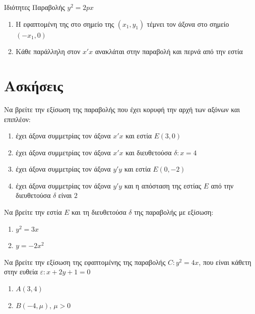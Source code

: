 \documentclass[greek]{beamer}
\begin{document}
\begin{frame}[label=Ιδιότητες]{Ιδιότητες Παραβολής $y^2=2px$}
  \begin{enumerate}
    \item<1-> Η εφαπτομένη της στο σημείο της $(x_1,y_1)$ τέμνει τον άξονα στο σημείο $(-x_1,0)$
    \item<2-> Κάθε παράλληλη στον $x'x$ ανακλάται στην παραβολή και περνά από την εστία
  \end{enumerate}

\end{frame}

\section{Ασκήσεις}
\begin{askisi}
  Να βρείτε την εξίσωση της παραβολής που έχει κορυφή την αρχή των αξόνων και επιπλέον:
  \begin{enumerate}
    \item<1-> έχει άξονα συμμετρίας τον άξονα $x'x$ και εστία $Ε(3,0)$
    \item<2-> έχει άξονα συμμετρίας τον άξονα $x'x$ και διευθετούσα $δ:x=4$
    \item<3-> έχει άξονα συμμετρίας τον άξονα $y'y$ και εστία $Ε(0,-2)$
    \item<4-> έχει άξονα συμμετρίας τον άξονα $y'y$ και η απόσταση της εστίας $Ε$ από την διευθετούσα $δ$ είναι $2$
  \end{enumerate}


\end{askisi}

\begin{askisi}
  Να βρείτε την εστία $Ε$ και τη διευθετούσα $δ$ της παραβολής με εξίσωση:
  \begin{enumerate}
    \item<1-> $y^2=3x$
    \item<2-> $y=-2x^2$
  \end{enumerate}


\end{askisi}

\begin{askisi}
  Να βρείτε την εξίσωση της εφαπτομένης της παραβολής $C:y^2=4x$, που είναι κάθετη στην ευθεία $ε:x+2y+1=0$
  \begin{enumerate}
    \item<1-> $Α(3,4)$
    \item<2-> $Β(-4,μ)$, $μ>0$
  \end{enumerate}


\end{askisi}
\end{document}
